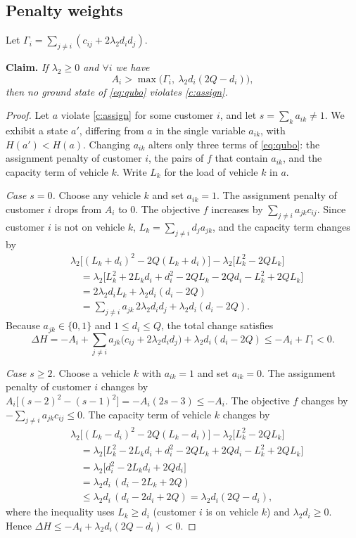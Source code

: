 \documentclass[10pt]{article}
\begin{document}
\subsection{Penalty weights}
\label{sec:weights}
Let $\Gamma_i=\sum_{j\ne i}(c_{ij}+2\lambda_2 d_id_j)$.
 
\medskip\noindent\textbf{Claim.} \emph{If $\lambda_2\ge0$ and $\forall i$ we have}
\begin{equation}
  A_i>\max\big(\Gamma_i,\ \lambda_2 d_i(2Q-d_i)\big),
  \label{eq:Abound}
\end{equation}
\emph{then no ground state of \eqref{eq:qubo} violates \eqref{c:assign}.}
 
\begin{proof}
Let $a$ violate \eqref{c:assign} for some customer $i$, and let $s=\sum_k a_{ik}\ne1$. We exhibit a state
$a'$, differing from $a$ in the single variable $a_{ik}$, with $H(a')<H(a)$. Changing $a_{ik}$ alters only
three terms of \eqref{eq:qubo}: the assignment penalty of customer $i$, the pairs of $f$ that contain
$a_{ik}$, and the capacity term of vehicle $k$. Write $L_k$ for the load of vehicle $k$ in $a$.
 
\emph{Case $s=0$.} Choose any vehicle $k$ and set $a_{ik}=1$. The assignment penalty of customer $i$ drops
from $A_i$ to $0$. The objective $f$ increases by $\sum_{j\ne i}a_{jk}c_{ij}$. Since customer $i$ is not on
vehicle $k$, $L_k=\sum_{j\ne i}d_ja_{jk}$, and the capacity term changes by
\begin{align*}
  &\lambda_2\big[(L_k+d_i)^2-2Q(L_k+d_i)\big]-\lambda_2\big[L_k^2-2QL_k\big]\\
  &\quad=\lambda_2\big[L_k^2+2L_kd_i+d_i^2-2QL_k-2Qd_i-L_k^2+2QL_k\big]\\
  &\quad=2\lambda_2d_iL_k+\lambda_2d_i(d_i-2Q)\\
  &\quad=\sum_{j\ne i}a_{jk}\,2\lambda_2d_id_j+\lambda_2d_i(d_i-2Q).
\end{align*}
Because $a_{jk}\in\{0,1\}$ and $1\le d_i\le Q$, the total change satisfies
\[
  \Delta H=-A_i+\sum_{j\ne i}a_{jk}\big(c_{ij}+2\lambda_2d_id_j\big)+\lambda_2d_i(d_i-2Q)
  \le -A_i+\Gamma_i<0 .
\]
 
\emph{Case $s\ge2$.} Choose a vehicle $k$ with $a_{ik}=1$ and set $a_{ik}=0$. The assignment penalty of
customer $i$ changes by $A_i\big[(s-2)^2-(s-1)^2\big]=-A_i(2s-3)\le-A_i$. The objective $f$ changes by
$-\sum_{j\ne i}a_{jk}c_{ij}\le0$. The capacity term of vehicle $k$ changes by
\begin{align*}
  &\lambda_2\big[(L_k-d_i)^2-2Q(L_k-d_i)\big]-\lambda_2\big[L_k^2-2QL_k\big]\\
  &\quad=\lambda_2\big[L_k^2-2L_kd_i+d_i^2-2QL_k+2Qd_i-L_k^2+2QL_k\big]\\
  &\quad=\lambda_2\big[d_i^2-2L_kd_i+2Qd_i\big]\\
  &\quad=\lambda_2d_i\,(d_i-2L_k+2Q)\\
  &\quad\le\lambda_2d_i\,(d_i-2d_i+2Q)=\lambda_2d_i(2Q-d_i),
\end{align*}
where the inequality uses $L_k\ge d_i$ (customer $i$ is on vehicle $k$) and $\lambda_2 d_i\ge0$. Hence
$\Delta H\le-A_i+\lambda_2d_i(2Q-d_i)<0$.
 

\end{proof}
\end{document}

